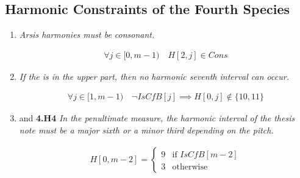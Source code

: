 \subsection*{Harmonic Constraints of the Fourth Species}
\begin{enumerate}[wide, label=\bfseries 4.H\arabic*]
  \item\label{rule:arsiscons} {\textit{Arsis harmonies must be consonant.}}

\begin{equation}
    \begin{gathered}
        \forall j \in [0, m-1) \quad
        H[2, j] \in Cons
    \end{gathered}
    \label{eq:arsiscons}
\end{equation}

\item\label{rule:noseventh} {\textit{If the \cfs is in the upper part, then no harmonic seventh interval can occur.}}

\begin{equation}
    \begin{gathered}
        \forall j \in [1, m-1) \quad
        \lnot IsCfB[j] \implies H[0, j] \notin \{10, 11\}
    \end{gathered}
\end{equation}

\item\label{rule:lowpenult4th} \label{rule:uppenult4th} {and \textbf{4.H4} \textit{In the penultimate measure, the harmonic interval of the thesis note must be a major sixth or a minor third depending on the \cfs pitch.}}

\begin{equation}
    \begin{gathered}
        H[0, m-2] = \begin{cases}
            9 & \text{if } IsCfB[m-2]\\
            3 & \text{otherwise}
        \end{cases}
    \end{gathered}
\end{equation}
\end{enumerate}
